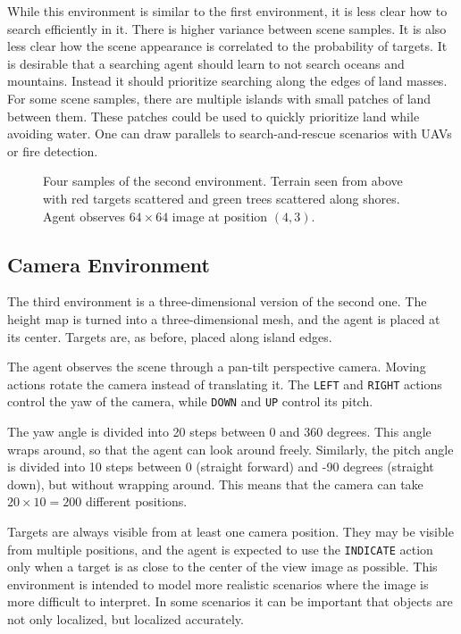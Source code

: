 While this environment is similar to the first environment, it is less clear how to search efficiently in it.
There is higher variance between scene samples.
It is also less clear how the scene appearance is correlated to the probability of targets.
It is desirable that a searching agent should learn to not search oceans and mountains.
Instead it should prioritize searching along the edges of land masses.
For some scene samples, there are multiple islands with small patches of land between them.
These patches could be used to quickly prioritize land while avoiding water.
One can draw parallels to search-and-rescue scenarios with UAVs or fire detection.

\begin{figure}
    \centering
    
    \caption[Terrain environment]{Four samples of the second environment. Terrain seen from above with red targets scattered and green trees scattered along shores. Agent observes \(64 \times 64\) image at position \((4, 3)\).}
    \label{fig:terrain}
\end{figure}

\subsection{Camera Environment}

The third environment is a three-dimensional version of the second one.
The height map is turned into a three-dimensional mesh, and the agent is placed at its center.
Targets are, as before, placed along island edges.

The agent observes the scene through a pan-tilt perspective camera.
Moving actions rotate the camera instead of translating it.
The \texttt{LEFT} and \texttt{RIGHT} actions control the yaw of the camera, while \texttt{DOWN} and \texttt{UP} control its pitch.

The yaw angle is divided into 20 steps between 0 and 360 degrees.
This angle wraps around, so that the agent can look around freely.
Similarly, the pitch angle is divided into 10 steps between 0 (straight forward) and -90 degrees (straight down), but without wrapping around.
This means that the camera can take \(20 \times 10 = 200\) different positions.

Targets are always visible from at least one camera position.
They may be visible from multiple positions, and the agent is expected to use the \texttt{INDICATE} action only when a target is as close to the center of the view image as possible.
This environment is intended to model more realistic scenarios where the image is more difficult to interpret.
In some scenarios it can be important that objects are not only localized, but localized accurately.

